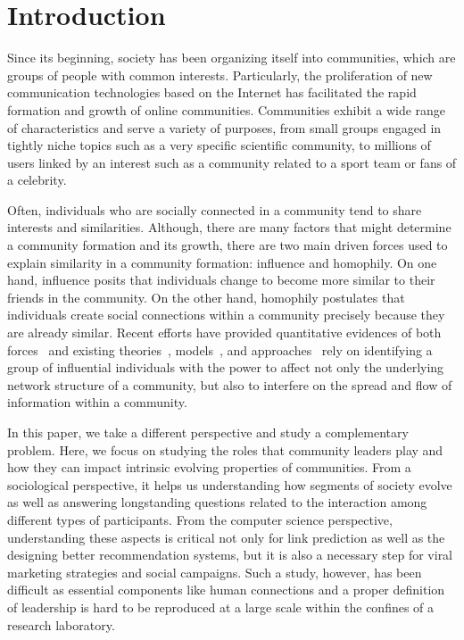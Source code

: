\section{Introduction}

Since its beginning, society has been organizing itself into communities, which are groups of people with common interests. Particularly, the proliferation of new communication
technologies based on the Internet has facilitated the rapid formation and growth of online communities. Communities exhibit a wide range of characteristics and serve a variety of
purposes, from small groups engaged in tightly niche topics such as a very specific scientific community, to millions of users linked by an interest such as a community related to
a sport team or fans of a celebrity. 

Often, individuals who are socially connected in a community tend to share interests and similarities. Although, there are many factors that might determine a community formation
and its growth, there are two main driven forces used to explain similarity in a community formation: influence and homophily. On one hand, influence posits that individuals change
to become more similar to their friends in the community. On the other hand, homophily postulates that individuals create social connections within a community precisely because
they are already similar. Recent efforts have provided quantitative evidences of both forces~\cite{icwsm10cha,crandall.kdd08,Backstrom:2006,influence.correlation.kdd08} and existing
theories~\cite{Rogers.1962,accidental-influential}, models~\cite{kempe03kdd,Kempe05influentialnodes}, and
approaches~\cite{saez-trumper@kdd12,Weng:2010:TFT:1718487.1718520} rely on identifying a group of influential individuals with the power to affect not only the underlying network
structure of a community, but also to interfere on the spread and flow of information within a community. 


In this paper, we take a different perspective and study a complementary problem. Here, we focus on studying the roles that community leaders play and how they can impact intrinsic
evolving properties of communities. From a sociological perspective, it helps us understanding how segments of society evolve as well as answering longstanding  questions related
to the interaction among different types of participants. From the computer science perspective, understanding  these aspects is
critical not only for link prediction as well as the designing better recommendation systems, but it is also a necessary step for viral marketing strategies and social campaigns.
Such a study, however, has been difficult as essential components like human connections and a proper definition of leadership is hard to be reproduced at a large scale within the
confines of a research laboratory.

